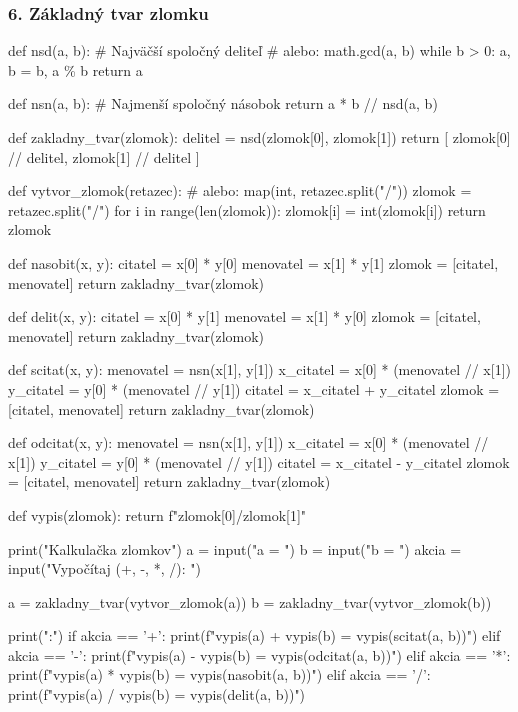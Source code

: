 \subsubsection*{6. Základný tvar zlomku}
\begin{solution}
def nsd(a, b):
    # Najväčší spoločný deliteľ
    # alebo: math.gcd(a, b)
    while b > 0:
        a, b = b, a \% b
    return a

def nsn(a, b):
    # Najmenší spoločný násobok
    return a * b // nsd(a, b)

def zakladny_tvar(zlomok):
    delitel = nsd(zlomok[0], zlomok[1])
    return [
        zlomok[0] // delitel,
        zlomok[1] // delitel
    ]

def vytvor_zlomok(retazec):
    # alebo: map(int, retazec.split("/"))
    zlomok = retazec.split("/")
    for i in range(len(zlomok)):
        zlomok[i] = int(zlomok[i])
    return zlomok

def nasobit(x, y):
    citatel = x[0] * y[0]
    menovatel = x[1] * y[1]
    zlomok = [citatel, menovatel]
    return zakladny_tvar(zlomok)

def delit(x, y):
    citatel = x[0] * y[1]
    menovatel = x[1] * y[0]
    zlomok = [citatel, menovatel]
    return zakladny_tvar(zlomok)

def scitat(x, y):
    menovatel = nsn(x[1], y[1])
    x_citatel = x[0] * (menovatel // x[1])
    y_citatel = y[0] * (menovatel // y[1])
    citatel = x_citatel + y_citatel
    zlomok = [citatel, menovatel]
    return zakladny_tvar(zlomok)

def odcitat(x, y):
    menovatel = nsn(x[1], y[1])
    x_citatel = x[0] * (menovatel // x[1])
    y_citatel = y[0] * (menovatel // y[1])
    citatel = x_citatel - y_citatel
    zlomok = [citatel, menovatel]
    return zakladny_tvar(zlomok)

def vypis(zlomok):
    return f"{zlomok[0]}/{zlomok[1]}"

print("Kalkulačka zlomkov")
a = input("a = ")
b = input("b = ")
akcia = input("Vypočítaj (+, -, *, /): ")

a = zakladny_tvar(vytvor_zlomok(a))
b = zakladny_tvar(vytvor_zlomok(b))

print(":")
if akcia == '+':
    print(f"{vypis(a)} + {vypis(b)} = {vypis(scitat(a, b))}")
elif akcia == '-':
    print(f"{vypis(a)} - {vypis(b)} = {vypis(odcitat(a, b))}")
elif akcia == '*':
    print(f"{vypis(a)} * {vypis(b)} = {vypis(nasobit(a, b))}")
elif akcia == '/':
    print(f"{vypis(a)} / {vypis(b)} = {vypis(delit(a, b))}")
\end{solution}
